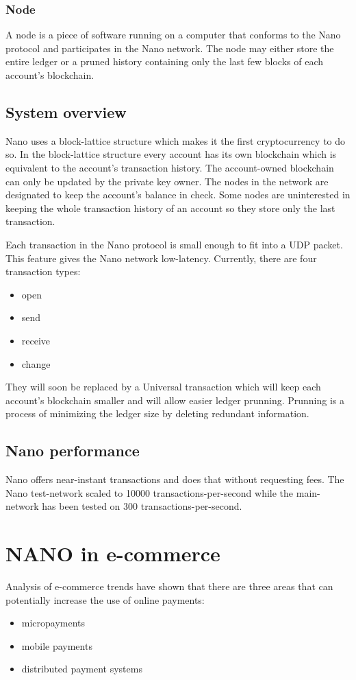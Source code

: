 \documentclass{ferseminar}
\begin{document}
\subsubsection{Node}
A node is a piece of software running on a computer that conforms to the Nano protocol and participates in the Nano network. The node may either store the entire ledger or a pruned history containing only the last few blocks of each account's blockchain.  

\subsection{System overview}

Nano uses a block-lattice structure which makes it the first cryptocurrency to do so. In the block-lattice structure every account has its own blockchain which is equivalent to the account's transaction history. The account-owned blockchain can only be updated by the private key owner. The nodes in the network are designated to keep the account's balance in check. Some nodes are uninterested in keeping the whole transaction history of an account so they store only the last transaction.

Each transaction in the Nano protocol is small enough to fit into a UDP packet. This feature gives the Nano network low-latency. Currently, there are four transaction types: 
\begin{itemize}
	\item open
	\item send
	\item receive
	\item change
\end{itemize}
They will soon be replaced by a Universal transaction which will keep each account's blockchain smaller and will allow easier ledger prunning. Prunning is a process of minimizing the ledger size by deleting redundant information. 

\subsection{Nano performance}
Nano offers near-instant transactions and does that without requesting fees. The Nano test-network scaled to 10000 transactions-per-second while the main-network has been tested on 300 transactions-per-second.


\section{NANO in e-commerce}
Analysis of e-commerce trends have shown that there are three areas that can potentially increase the use of online payments:
\begin{itemize}
	\item micropayments
	\item mobile payments
	\item distributed payment systems
\end{itemize}
\end{document}
